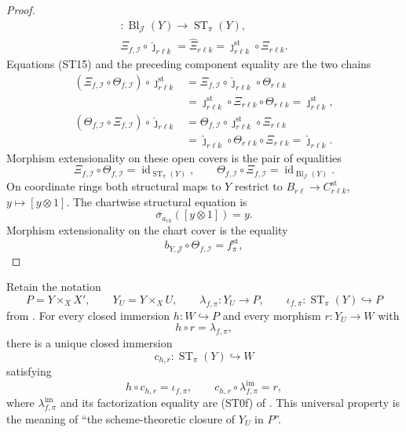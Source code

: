 \begin{proof}
\[\begin{gathered}
      \colon\operatorname{Bl}_{\mathcal J}(Y)\to
        \operatorname{ST}_\pi(Y),\\
    \Xi_{f,\mathcal I}\circ\widehat\jmath_{r\ell k}
      =\widehat\Xi_{r\ell k}
      =\jmath_{r\ell k}^{\mathrm{st}}\circ\Xi_{r\ell k}.
  \end{gathered}
  \]
  Equations (ST15) and the preceding component equality are the two chains
  \[
  \begin{aligned}
    (\Xi_{f,\mathcal I}\circ\Theta_{f,\mathcal I})
      \circ\jmath_{r\ell k}^{\mathrm{st}}
      &=\Xi_{f,\mathcal I}\circ\widehat\jmath_{r\ell k}
          \circ\Theta_{r\ell k}\\
      &=\jmath_{r\ell k}^{\mathrm{st}}\circ\Xi_{r\ell k}
          \circ\Theta_{r\ell k}
       =\jmath_{r\ell k}^{\mathrm{st}},\\
    (\Theta_{f,\mathcal I}\circ\Xi_{f,\mathcal I})
      \circ\widehat\jmath_{r\ell k}
      &=\Theta_{f,\mathcal I}\circ\jmath_{r\ell k}^{\mathrm{st}}
          \circ\Xi_{r\ell k}\\
      &=\widehat\jmath_{r\ell k}\circ\Theta_{r\ell k}
          \circ\Xi_{r\ell k}
       =\widehat\jmath_{r\ell k}.
  \end{aligned}
  \]
  Morphism extensionality on these open covers is the pair of equalities
  \[
    \Xi_{f,\mathcal I}\circ\Theta_{f,\mathcal I}
      =\operatorname{id}_{\operatorname{ST}_\pi(Y)},
    \qquad
    \Theta_{f,\mathcal I}\circ\Xi_{f,\mathcal I}
      =\operatorname{id}_{\operatorname{Bl}_{\mathcal J}(Y)}.
  \]
  On coordinate rings both structural maps to $Y$ restrict to
  $B_{r\ell}\to C^{\mathrm{st}}_{r\ell k}$, $y\mapsto[y\otimes1]$.
  The chartwise structural equation is
  \[
    \overline\sigma_{a_{rk}}([y\otimes1])=y.
  \]
  Morphism extensionality on the chart cover is the equality
  \[
    b_{Y,\mathcal J}\circ\Theta_{f,\mathcal I}
      = f^{\mathrm{st}}_\pi,
  \]
\end{proof}


\begin{lemma}
  \label{lemma:nagata-strict-transform-closure-characterization}
  \lean{}

  Retain the notation
  \[
    P=Y\times_XX',\qquad Y_U=Y\times_XU,\qquad
    \lambda_{f,\pi}\colon Y_U\to P,\qquad
    \iota_{f,\pi}\colon\operatorname{ST}_\pi(Y)\hookrightarrow P
  \]
  from .  For every closed immersion
  $h\colon W\hookrightarrow P$ and every morphism $r\colon Y_U\to W$ with
  \[
    h\circ r=\lambda_{f,\pi},
  \]
  there is a unique closed immersion
  \[
    c_{h,r}\colon\operatorname{ST}_\pi(Y)\hookrightarrow W
  \]
  satisfying
  \[
    h\circ c_{h,r}=\iota_{f,\pi},
    \qquad
    c_{h,r}\circ\lambda_{f,\pi}^{\mathrm{im}}=r,
  \]
  where $\lambda_{f,\pi}^{\mathrm{im}}$ and its factorization equality are
  (ST0f) of .  This universal property is the
  meaning of ``the scheme-theoretic closure of $Y_U$ in $P$''.
\end{lemma}

